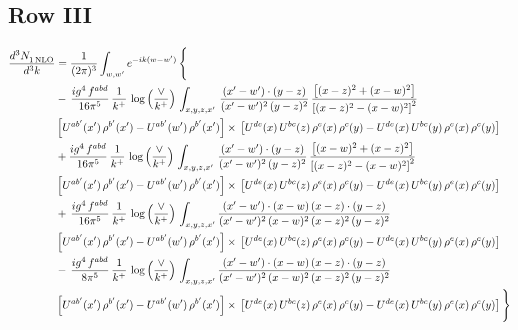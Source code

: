 \documentclass[9pt]{article}
\numberwithin{equation}{section}
\begin{document}
\subsection{Row III}
\begin{align}
   \frac{d^{3}N_{1\,\rm NLO}^{\rm}}{d^{3}k}  & =  \frac{1}{(2\pi)^{3}}  \int_{w, w^\prime} e^{-ik(w-w^\prime)}\, \Bigg\{\notag \\
& -\,\frac{ig^{4}\,f^{abd}}{16\pi^{5}}\,\frac{1}{k^{+}}\,\log{\left(\frac{\vee}{k^{+}}\right)}\,\int_{x,y,z,x'}\, \frac{(x'-w')\cdot (y-z)}{(x'-w')^{2}\,(y-z)^{2}}\,\frac{\left[(x-z)^{2}+(x-w)^{2}\right]}{\left[(x-z)^{2}-(x-w)^{2}\right]^{2}}\notag \\ & \left[U^{ab'}(x')\,\rho^{b'}(x')-U^{ab'}(w')\, \rho^{b'}(x')\right]\times\, \left[U^{de}(x)\,U^{bc}(z)\, \rho^{e}(x)\,\rho^{c}(y)-U^{de}(x)\,U^{bc}(y)\,\rho^{e}(x)\,\rho^{c}(y)\right] \notag \\
&  +\frac{ig^{4}\,f^{abd}}{16\pi^{5}}\, \frac{1}{k^{+}}\,\log{\left(\frac{\vee}{k^{+}}\right)}\,\int_{x,y,z,x'}\, \frac{(x'-w')\cdot (y-z)}{(x'-w')^{2}\,(y-z)^{2}}\, \frac{\left[(x-w)^{2}+(x-z)^{2}\right]}{\left[(x-z)^{2}-(x-w)^{2}\right]^{2}}\notag \\ & \left[U^{ab'}(x')\,\rho^{b'}(x')-U^{ab'}(w')\, \rho^{b'}(x')\right]\times\, \left[U^{de}(x)\,U^{bc}(z)\, \rho^{e}(x)\,\rho^{c}(y)-U^{de}(x)\,U^{bc}(y)\,\rho^{e}(x)\,\rho^{c}(y)\right] \notag \\
& +\, \frac{ig^{4}\,f^{abd}}{16\pi^{5}}\,\frac{1}{k^{+}}\,\log{\left(\frac{\vee}{k^{+}}\right)}\,\int_{x,y,z,x'} \frac{(x'-w')\cdot (x-w)\, (x-z)\cdot (y-z)}{(x'-w')^{2}\, (x-w)^{2}\, (x-z)^{2}\, (y-z)^{2}}\, \notag \\ & \left[U^{ab'}(x')\,\rho^{b'}(x')-U^{ab'}(w')\, \rho^{b'}(x')\right]\times\, \left[U^{de}(x)\,U^{bc}(z)\, \rho^{e}(x)\,\rho^{c}(y)-U^{de}(x)\,U^{bc}(y)\,\rho^{e}(x)\,\rho^{c}(y)\right] \notag \\
&-\, \frac{ig^{4}\,f^{abd}}{8\pi^{5}}\,\frac{1}{k^{+}}\,\log{\left(\frac{\vee}{k^{+}}\right)}\,\int_{x,y,z,x'}\frac{(x'-w')\cdot (x-w)\, (x-z)\cdot (y-z)}{(x'-w')^{2}\, (x-w)^{2}\, (x-z)^{2}\, (y-z)^{2}} \notag \\ & \left[U^{ab'}(x')\,\rho^{b'}(x')-U^{ab'}(w')\, \rho^{b'}(x')\right]\times\, \left[U^{de}(x)\,U^{bc}(z)\, \rho^{e}(x)\,\rho^{c}(y)-U^{de}(x)\,U^{bc}(y)\,\rho^{e}(x)\,\rho^{c}(y)\right]\Bigg\}
\end{align}
\end{document}
